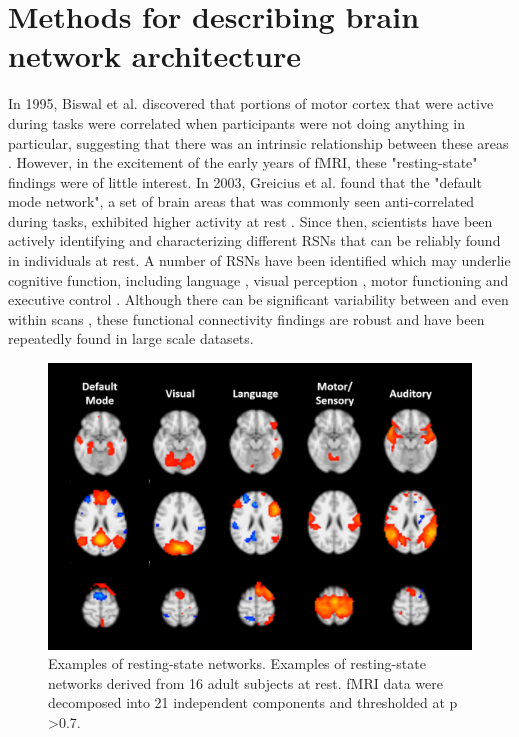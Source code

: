 \section{Methods for describing brain network architecture}

In 1995, Biswal et al. discovered that portions of motor cortex that were active during tasks were correlated when participants were not doing anything in particular, suggesting that there was an intrinsic relationship between these areas \citep{Biswal1995}. However, in the excitement of the early years of fMRI, these "resting-state" findings were of little interest. In 2003, Greicius et al. found that the "default mode network", a set of brain areas that was commonly seen anti-correlated during tasks, exhibited higher activity at rest \citep{Greicius2003}. Since then, scientists have been actively identifying and characterizing different RSNs that can be reliably found in individuals at rest. A number of RSNs have been identified which may underlie cognitive function, including language \citep{Cordes2000, Hampson2002}, visual perception \citep{Cordes2000, Simmons2012}, motor functioning \citep{Biswal1995} and executive control \citep{Seeley2007, Simmons2012}. Although there can be significant variability between and even within scans \citep{Honey2009}, these functional connectivity findings are robust and have been repeatedly found in large scale datasets.

\begin{figure}[t]
    \centering
    \includegraphics[width=12cm]{images/ch1-ica.png}
    \caption{Examples of resting-state networks. Examples of resting-state networks derived from 16 adult subjects at rest. fMRI data were decomposed into 21 independent components and thresholded at p \textgreater 0.7.} 
\end{figure}

